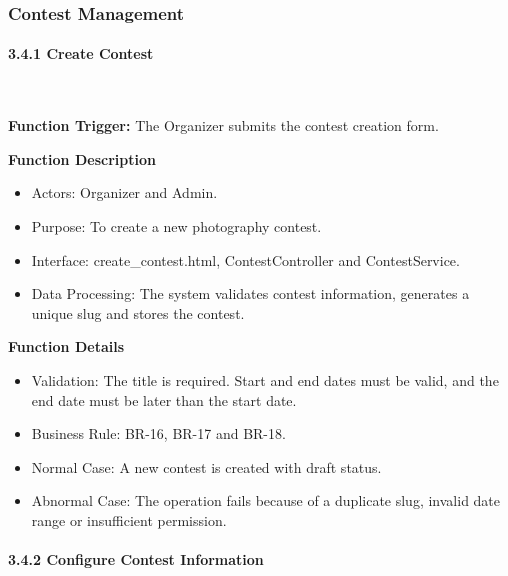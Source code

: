 \subsubsection{Contest Management}
\label{subsubsec:contest-management}

\paragraph*{3.4.1 Create Contest}\leavevmode\\[-0.5em]
\label{par:create-contest}

\textbf{Function Trigger:} The Organizer submits the contest creation form.

\textbf{Function Description}
\begin{itemize}[leftmargin=1.5em, nosep]
    \item Actors: Organizer and Admin.
    \item Purpose: To create a new photography contest.
    \item Interface: create\_contest.html, ContestController and ContestService.
    \item Data Processing: The system validates contest information, generates a unique slug and stores the contest.
\end{itemize}

\textbf{Function Details}
\begin{itemize}[leftmargin=1.5em, nosep]
    \item Validation: The title is required. Start and end dates must be valid, and the end date must be later than the start date.
    \item Business Rule: BR-16, BR-17 and BR-18.
    \item Normal Case: A new contest is created with draft status.
    \item Abnormal Case: The operation fails because of a duplicate slug, invalid date range or insufficient permission.
\end{itemize}

\paragraph*{3.4.2 Configure Contest Information}\leavevmode\\[-0.5em]
\label{par:configure-contest-information}

